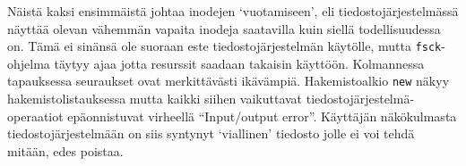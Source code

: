 Näistä kaksi ensimmäistä johtaa inodejen `vuotamiseen',
eli tiedostojärjestelmässä näyttää olevan vähemmän vapaita inodeja saatavilla kuin siellä todellisuudessa on.
Tämä ei sinänsä ole suoraan este tiedostojärjestelmän käytölle,
mutta \texttt{fsck}-ohjelma täytyy ajaa jotta resurssit saadaan takaisin käyttöön.
Kolmannessa tapauksessa seuraukset ovat merkittävästi ikävämpiä.
Hakemistoalkio \texttt{new} näkyy hakemistolistauksessa mutta kaikki siihen vaikuttavat tiedostojärjestelmä-operaatiot epäonnistuvat virheellä ``Input/output error''.
Käyttäjän näkökulmasta tiedostojärjestelmään on siis syntynyt `viallinen' tiedosto jolle ei voi tehdä mitään, edes poistaa.


